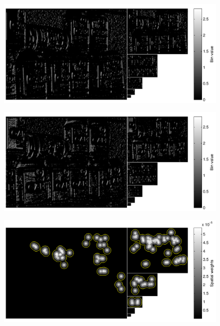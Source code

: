 \documentclass[thesis.tex]{subfiles}
\begin{document}
\begin{figure}[tb]
    \centering
    \includegraphics[width=\textwidth]{img/cellHistScaleSpacesBin01.pdf}
    \caption{}
    \label{fig:cellHistScaleSpacesBin01}
\end{figure}

\begin{figure}[tb]
    \centering
    \includegraphics[width=\textwidth]{img/cellHistScaleSpacesBin07.pdf}
    \caption{}
    \label{fig:cellHistScaleSpacesBin07}
\end{figure}

\begin{figure}[tb]
    \centering
    \includegraphics[width=\textwidth]{img/cellHistScaleSpacesSpatialWeights.pdf}
    \caption{}
    \label{fig:cellHistScaleSpacesSpatialWeights}
\end{figure}
%
\end{document}
